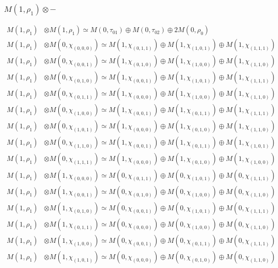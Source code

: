 \subsubsection{$ M(1,\rho_{1})\otimes -$}
\begin{align*}
M(1,\rho_{1}) &\otimes M(1,\rho_{1}) \simeq M(0,\tau_{01}) \oplus M(0,\tau_{02}) \oplus 2 M(0,\rho_{0}) \\
M(1,\rho_{1}) &\otimes M(0,\chi_{(0,0,0)}) \simeq M(1,\chi_{(0,1,1)}) \oplus M(1,\chi_{(1,0,1)}) \oplus M(1,\chi_{(1,1,1)}) \\
M(1,\rho_{1}) &\otimes M(0,\chi_{(0,0,1)}) \simeq M(1,\chi_{(0,1,0)}) \oplus M(1,\chi_{(1,0,0)}) \oplus M(1,\chi_{(1,1,0)}) \\
M(1,\rho_{1}) &\otimes M(0,\chi_{(0,1,0)}) \simeq M(1,\chi_{(0,0,1)}) \oplus M(1,\chi_{(1,0,1)}) \oplus M(1,\chi_{(1,1,1)}) \\
M(1,\rho_{1}) &\otimes M(0,\chi_{(0,1,1)}) \simeq M(1,\chi_{(0,0,0)}) \oplus M(1,\chi_{(1,0,0)}) \oplus M(1,\chi_{(1,1,0)}) \\
M(1,\rho_{1}) &\otimes M(0,\chi_{(1,0,0)}) \simeq M(1,\chi_{(0,0,1)}) \oplus M(1,\chi_{(0,1,1)}) \oplus M(1,\chi_{(1,1,1)}) \\
M(1,\rho_{1}) &\otimes M(0,\chi_{(1,0,1)}) \simeq M(1,\chi_{(0,0,0)}) \oplus M(1,\chi_{(0,1,0)}) \oplus M(1,\chi_{(1,1,0)}) \\
M(1,\rho_{1}) &\otimes M(0,\chi_{(1,1,0)}) \simeq M(1,\chi_{(0,0,1)}) \oplus M(1,\chi_{(0,1,1)}) \oplus M(1,\chi_{(1,0,1)}) \\
M(1,\rho_{1}) &\otimes M(0,\chi_{(1,1,1)}) \simeq M(1,\chi_{(0,0,0)}) \oplus M(1,\chi_{(0,1,0)}) \oplus M(1,\chi_{(1,0,0)}) \\
M(1,\rho_{1}) &\otimes M(1,\chi_{(0,0,0)}) \simeq M(0,\chi_{(0,1,1)}) \oplus M(0,\chi_{(1,0,1)}) \oplus M(0,\chi_{(1,1,1)}) \\
M(1,\rho_{1}) &\otimes M(1,\chi_{(0,0,1)}) \simeq M(0,\chi_{(0,1,0)}) \oplus M(0,\chi_{(1,0,0)}) \oplus M(0,\chi_{(1,1,0)}) \\
M(1,\rho_{1}) &\otimes M(1,\chi_{(0,1,0)}) \simeq M(0,\chi_{(0,0,1)}) \oplus M(0,\chi_{(1,0,1)}) \oplus M(0,\chi_{(1,1,1)}) \\
M(1,\rho_{1}) &\otimes M(1,\chi_{(0,1,1)}) \simeq M(0,\chi_{(0,0,0)}) \oplus M(0,\chi_{(1,0,0)}) \oplus M(0,\chi_{(1,1,0)}) \\
M(1,\rho_{1}) &\otimes M(1,\chi_{(1,0,0)}) \simeq M(0,\chi_{(0,0,1)}) \oplus M(0,\chi_{(0,1,1)}) \oplus M(0,\chi_{(1,1,1)}) \\
M(1,\rho_{1}) &\otimes M(1,\chi_{(1,0,1)}) \simeq M(0,\chi_{(0,0,0)}) \oplus M(0,\chi_{(0,1,0)}) \oplus M(0,\chi_{(1,1,0)}) \\

\end{align*}
